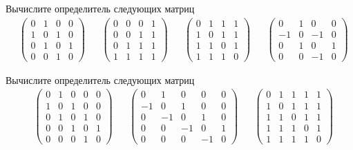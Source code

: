 \begin{exercise}
Вычислите определитель следующих матриц
\begin{align*}
	& \begin{pmatrix}
		0 & 1 & 0 & 0 \\ 1 & 0 & 1 & 0 \\ 
		0 & 1 & 0 & 1 \\ 0 & 0 & 1 & 0 
	\end{pmatrix} &
	& \begin{pmatrix}
		0 & 0 & 0 & 1 \\ 0 & 0 & 1 & 1 \\ 
		0 & 1 & 1 & 1 \\ 1 & 1 & 1 & 1
	\end{pmatrix} &
	& \begin{pmatrix}
		0 & 1 & 1 & 1\\ 1 & 0 & 1 & 1\\ 
		1 & 1 & 0 & 1 \\ 1 & 1 & 1 & 0
	\end{pmatrix} &
	& \begin{pmatrix}
		0 & 1 & 0 & 0 \\ -1 & 0 & -1 & 0 \\ 
		0 & 1 & 0 & 1 \\ 0 & 0 & -1 & 0
	\end{pmatrix}
\end{align*}
\end{exercise}

\begin{exercise}
Вычислите определитель следующих матриц
\begin{align*}
	& \begin{pmatrix}
		0 & 1 & 0 & 0 & 0 \\ 1 & 0 & 1 & 0 & 0\\ 
		0 & 1 & 0 & 1 & 0 \\ 0 & 0 & 1 & 0 & 1 \\
		0 & 0 & 0 & 1 & 0
	\end{pmatrix} &
	& \begin{pmatrix}
		0 & 1 & 0 & 0 & 0 \\ -1 & 0 & 1 & 0 & 0\\ 
		0 & -1 & 0 & 1 & 0 \\ 0 & 0 & -1 & 0 & 1 \\
		0 & 0 & 0 & -1 & 0
	\end{pmatrix} &
	& \begin{pmatrix}
		0 & 1 & 1 & 1 & 1\\ 1 & 0 & 1 & 1 & 1\\ 
		1 & 1 & 0 & 1 & 1\\ 1 & 1 & 1 & 0 & 1\\
		1 & 1 & 1 & 1 & 0 
	\end{pmatrix} 
\end{align*}
\end{exercise}

